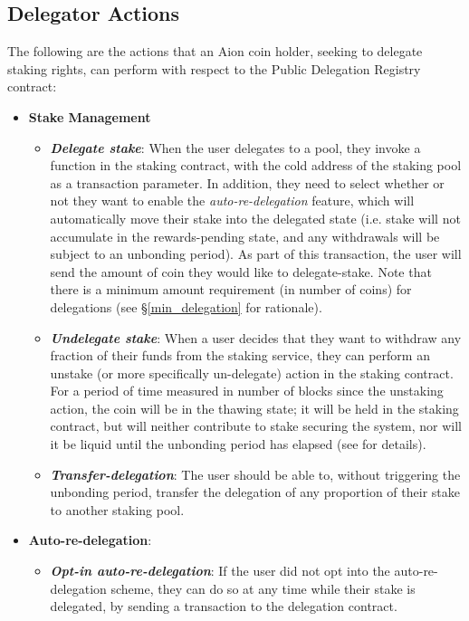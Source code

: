 \subsection{Delegator Actions}
The following are the actions that an Aion coin holder, seeking to delegate staking rights, can perform with respect to the Public Delegation Registry contract: 
\begin{itemize}
    \item \textbf{Stake Management}
    \begin{itemize}
        \item \textit{\textbf{Delegate stake}}: When the user delegates to a pool, they invoke a function in the staking contract, with the cold address of the staking pool as a transaction parameter. In addition, they need to select whether or not they want to enable the \textit{auto-re-delegation} feature, which will automatically move their stake into the delegated state (i.e. stake will not accumulate in the rewards-pending state, and any withdrawals will be subject to an unbonding period). As part of this transaction, the user will send the amount of coin they would like to delegate-stake. Note that there is a minimum amount requirement (in number of coins) for delegations (see \S\ref{min_delegation} for rationale). 
        \item \textit{\textbf{Undelegate stake}}: When a user decides that they want to withdraw any fraction of their funds from the staking service, they can perform an unstake (or more specifically un-delegate) action in the staking contract. For a period of time measured in number of blocks since the unstaking action, the coin will be in the thawing state; it will be held in the staking contract, but will neither contribute to stake securing the system, nor will it be liquid until the unbonding period has elapsed (see \cite{WZS19} for details).
        \item \textit{\textbf{Transfer-delegation}}: The user should be able to, without triggering the unbonding period, transfer the delegation of any proportion of their stake to another staking pool.
    \end{itemize}
    \item \textbf{Auto-re-delegation}: 
    \begin{itemize}
        \item \textit{\textbf{Opt-in auto-re-delegation}}: If the user did not opt into the auto-re-delegation scheme, they can do so at any time while their stake is delegated, by sending a transaction to the delegation contract. 

\end{itemize}
\end{itemize}
